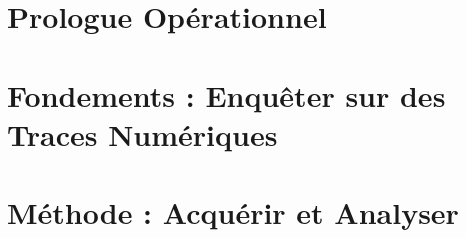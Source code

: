 \documentclass[12pt, twoside, openright, a4paper]{book}
\begin{document}
\frontmatter

    
    \cleardoublepage

    
    \cleardoublepage

    
    \cleardoublepage

    
    \cleardoublepage

    \tableofcontents
    \cleardoublepage

    \listoffigures
    \listoftables
    \cleardoublepage

\mainmatter

    \part*{Prologue Opérationnel}

        \setcounter{chapter}{-1}
        

    \part{Fondements : Enquêter sur des Traces Numériques}
    \label{part:fondements}

        
        

    \part{Méthode : Acquérir et Analyser}
    \label{part:methode}

        
        
        
        
        
\end{document}

